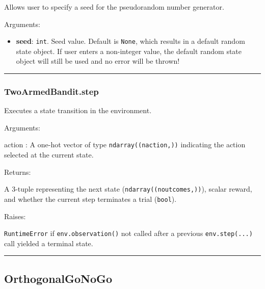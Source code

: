 Allows user to specify a seed for the pseudorandom number generator.

Arguments:

\begin{itemize}
\tightlist
\item
  \textbf{seed}: \texttt{int}. Seed value. Default is \texttt{None},
  which results in a default random state object. If user enters a
  non-integer value, the default random state object will still be used
  and no error will be thrown!
\end{itemize}

\begin{center}\rule{0.5\linewidth}{\linethickness}\end{center}

\subsubsection{TwoArmedBandit.step}\label{twoarmedbandit.step}

\begin{Shaded}
\begin{Highlighting}[]
\end{Highlighting}
\end{Shaded}

Executes a state transition in the environment.

Arguments:

action : A one-hot vector of type \texttt{ndarray((naction,))}
indicating the action selected at the current state.

Returns:

A 3-tuple representing the next state (\texttt{ndarray((noutcomes,))}),
scalar reward, and whether the current step terminates a trial
(\texttt{bool}).

Raises:

\texttt{RuntimeError} if \texttt{env.observation()} not called after a
previous \texttt{env.step(...)} call yielded a terminal state.

\begin{center}\rule{0.5\linewidth}{\linethickness}\end{center}

\subsection{OrthogonalGoNoGo}\label{orthogonalgonogo}

